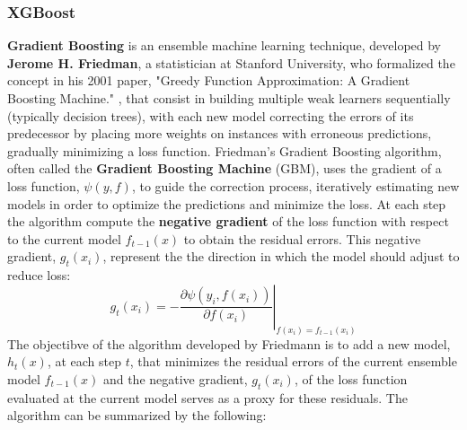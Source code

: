 \subsubsection{XGBoost}
\label{sec:Gradient Boosting}
\textbf{Gradient Boosting} is an ensemble machine learning technique, developed by \textbf{Jerome H. Friedman}, a statistician at Stanford University, who formalized the concept in his 2001 paper, "Greedy Function Approximation: A Gradient Boosting Machine." \cite{Friedman2001}, that consist in building multiple weak learners sequentially (typically decision trees), with each new model correcting the errors of its predecessor by placing more weights on instances with erroneous predictions, gradually minimizing a loss function. Friedman’s Gradient Boosting algorithm, often called the \textbf{Gradient Boosting Machine} (GBM), uses the gradient of a loss function, $\psi(y, f)$, to guide the correction process, iteratively estimating new models in order to optimize the predictions and minimize the loss. At each step the algorithm compute the \textbf{negative gradient} of the loss function with respect to the current model $f_{t-1}(x)$ to obtain the residual errors. This negative gradient, $g_t(x_i)$, represent the the direction in which the model should adjust to reduce loss:
\[
    g_t(x_i) = -\left.\frac{\partial \psi(y_i, f(x_i))}{\partial f(x_i)}\right|_{f(x_i) = f_{t-1}(x_i)}
\]
The objectibve of the algorithm developed by Friedmann is to add a new model, $h_t(x)$, at each step $t$, that minimizes the residual errors of the current ensemble model $f_{t-1}(x)$ and the negative gradient,  $g_t(x_i)$, of the loss function evaluated at the current model serves as a proxy for these residuals. The algorithm can be summarized by the following:
